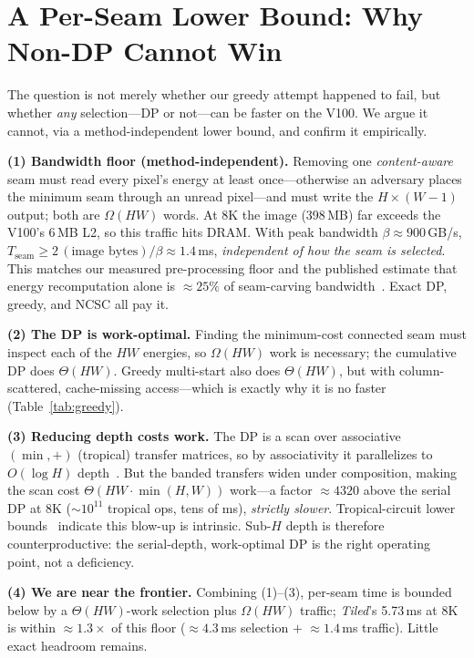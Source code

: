 \documentclass[conference]{IEEEtran}
\begin{document}


\section{A Per-Seam Lower Bound: Why Non-DP Cannot Win}
\label{app:greedy}
The question is not merely whether our greedy attempt happened to fail, but
whether \emph{any} selection---DP or not---can be faster on the V100. We argue it
cannot, via a method-independent lower bound, and confirm it empirically.

\textbf{(1) Bandwidth floor (method-independent).}
Removing one \emph{content-aware} seam must read every pixel's energy at least
once---otherwise an adversary places the minimum seam through an unread
pixel---and must write the $H{\times}(W{-}1)$ output; both are $\Omega(HW)$ words.
At 8K the image (398\,MB) far exceeds the V100's 6\,MB L2, so this traffic hits
DRAM. With peak bandwidth $\beta{\approx}900$\,GB/s,
$T_\text{seam} \ge 2\,(\text{image bytes})/\beta \approx 1.4$\,ms,
\emph{independent of how the seam is selected}. This matches our measured
pre-processing floor and the published estimate that energy recomputation alone
is ${\approx}25\%$ of seam-carving bandwidth~\cite{kim2015}. Exact DP, greedy,
and NCSC all pay it.

\textbf{(2) The DP is work-optimal.}
Finding the minimum-cost connected seam must inspect each of the $HW$ energies,
so $\Omega(HW)$ work is necessary; the cumulative DP does $\Theta(HW)$. Greedy
multi-start also does $\Theta(HW)$, but with column-scattered, cache-missing
access---which is exactly why it is no faster (Table~\ref{tab:greedy}).

\textbf{(3) Reducing depth costs work.}
The DP is a scan over associative $(\min,+)$ (tropical) transfer matrices, so by
associativity it parallelizes to $O(\log H)$ depth~\cite{maleki2014}. But the
banded transfers widen under composition, making the scan cost
$\Theta(HW\!\cdot\!\min(H,W))$ work---a factor ${\approx}4320$ above the serial
DP at 8K (${\sim}10^{11}$ tropical ops, tens of ms), \emph{strictly slower}.
Tropical-circuit lower bounds~\cite{jukna2015} indicate this blow-up is intrinsic.
Sub-$H$ depth is therefore counterproductive: the serial-depth, work-optimal DP
is the right operating point, not a deficiency.

\textbf{(4) We are near the frontier.}
Combining (1)--(3), per-seam time is bounded below by a $\Theta(HW)$-work
selection plus $\Omega(HW)$ traffic; \emph{Tiled}'s 5.73\,ms at 8K is within
${\approx}1.3\times$ of this floor (${\approx}4.3$\,ms selection $+$
${\approx}1.4$\,ms traffic). Little exact headroom remains.
\end{document}
